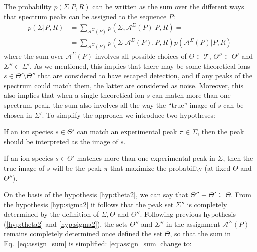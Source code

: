 The probability $p(\Sigma|P,R)$ can be written as the sum over the different
ways that spectrum peaks can be assigned to the sequence $P$:
\begin{align}
p(\Sigma|P,R)&=
\sum_{\mathcal A^\Sigma(P)}
p(\Sigma,\mathcal A^\Sigma(P)|P,R)=\\
&=
\sum_{\mathcal A^\Sigma(P)}
p(\Sigma|\mathcal A^\Sigma(P),P,R)
p(\mathcal A^\Sigma(P)|P,R)
\label{eq:assign_sum}
\end{align}
where the sum over $\mathcal A^\Sigma(P)$ involves all possible choices of  $\Theta \subset \mathcal
T$, $\Theta''\subset \Theta'$ and $\Sigma''\subset \Sigma'$.
As we mentioned, 
this implies that there may be some theoretical ions $s\in\Theta'\setminus\Theta''$
that are considered to have escaped detection, and %
if any peaks  of the spectrum could match them, the latter are considered as noise.
Moreover, this also implies that when  a single theoretical ion $s$ can match more
than  one spectrum peak, the sum also involves all the way the ``true'' image of $s$ can be chosen in $\Sigma'$.
To simplify the approach we introduce two hypotheses:
\begin{hypothesis}
If an ion species $s\in\Theta'$ can match an experimental peak $\pi\in\Sigma$,
then the peak should be interpreted as the image of $s$.
\label{hyp:theta2}
\end{hypothesis}
\begin{hypothesis}
If an ion species $s\in\Theta'$ matches more than one experimental peak in $\Sigma$,
then the true image of $s$ will be the peak $\pi$ that maximize the probability
(at fixed $\Theta$ and $\Theta''$).
\label{hyp:sigma2}
\end{hypothesis}
On the basis of the hypothesis \ref{hyp:theta2}, we can say that
$\Theta''\equiv\Theta'\subseteq\Theta$. From the hypothesis \ref{hyp:sigma2} it
follows that the peak set $\Sigma''$ is completely determined by the definition
of $\Sigma,\Theta$ and $\Theta''$.
Following previous hypothesis (\ref{hyp:theta2} and \ref{hyp:sigma2}), 
the sets $\Theta''$ and $\Sigma''$ in the assignment $\mathcal A^\Sigma(P)$
remains completely determined  once defined the set  $\Theta$, so that the sum
in Eq.~\ref{eq:assign_sum} is simplified:
\ref{eq:assign_sum} change to:
